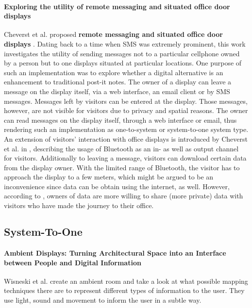\paragraph{Exploring the utility of remote messaging and situated office door displays}
Cheverst et al. proposed \textbf{remote messaging and situated office door displays} \cite{cheverst2003exploring}.
Dating back to a time when SMS was extremely prominent, this work investigates the utility of sending messages not to a particular cellphone owned by a person but to one displays situated at particular locations.
One purpose of such an implementation was to explore whether a digital alternative is an enhancement to traditional post-it notes.
The owner of a display can leave a message on the display itself, via a web interface, an email client or by SMS messages.
Messages left by visitors can be entered at the display.
Those messages, however, are not visible for visitors due to privacy and spatial reasons.
The owner can read messages on the display itself, through a web interface or email, thus rendering such an implementation as one-to-system or system-to-one system type.
An extension of visitors’ interaction with office displays is introduced by Cheverst et al. in \cite{cheverst2005exploring}, describing the usage of Bluetooth as an in- as well as output channel for visitors.
Additionally to leaving a message, visitors can download certain data from the display owner.
With the limited range of Bluetooth, the visitor has to approach the display to a few meters, which might be argued to be an inconvenience since data can be obtain using the internet, as well.
However, according to \cite{cheverst2005exploring}, owners of data are more willing to share (more private) data with visitors who have made the journey to their office.

\subsection{System-To-One}

\paragraph{Ambient Displays: Turning Architectural Space into an Interface between People and Digital Information}
Wisneski et al. \cite{wisneski_ambient_1998} create an ambient room and take a look at what possible mapping techniques there are to represent different types of information to the user. They use light, sound and movement to inform the user in a subtle way.

